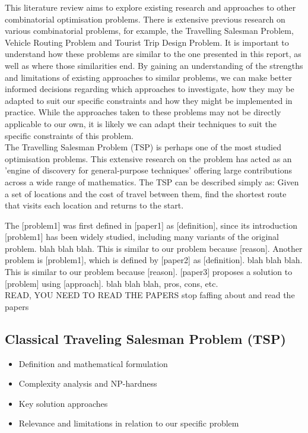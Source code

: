 This literature review aims to explore existing research and approaches to other combinatorial optimisation problems.
There is extensive previous research on various combinatorial problems, for example, the Travelling Salesman
Problem, Vehicle Routing Problem and Tourist Trip Design Problem.
It is important to understand how these problems are similar to the one presented in this report, as well as where
those similarities end.
By gaining an understanding of the strengths and limitations of existing approaches to similar problems, we can make
better informed decisions regarding which approaches to investigate, how they may be adapted to suit our specific
constraints and how they might be implemented in practice.
While the approaches taken to these problems may not be directly applicable to our own, it is likely we can adapt their
techniques to suit the specific constraints of this problem.\\

The Travelling Salesman Problem (TSP) is perhaps one of the most studied optimisation problems.
This extensive research on the problem has acted as an 'engine of discovery for general-purpose techniques' offering
large contributions across a wide range of mathematics. 
The TSP can be described simply as: Given a set of locations and the cost of travel between them, find the shortest
route that visits each location and returns to the start.


The [problem1] was first defined in [paper1] as [definition], since its introduction [problem1] has been widely
studied, including many variants of the original problem.
blah blah blah.
This is similar to our problem because [reason].
Another problem is [problem1], which is defined by [paper2] as [definition].
blah blah blah.
This is similar to our problem because [reason].
[paper3] proposes a solution to [problem] using [approach].
blah blah blah, pros, cons, etc.\\

READ, YOU NEED TO READ THE PAPERS stop faffing about and read the papers


\subsection{Classical Traveling Salesman Problem (TSP)}
\begin{itemize}
    \item Definition and mathematical formulation
    \item Complexity analysis and NP-hardness
    \item Key solution approaches
    \item Relevance and limitations in relation to our specific problem
\end{itemize}


